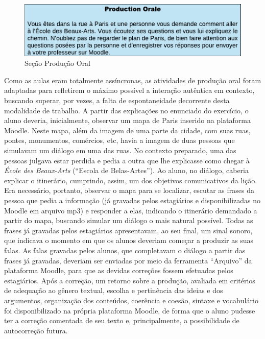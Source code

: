 \begin{figure}[htbp]
	\centering
	\begin{minipage}{0.8\textwidth}
		\includegraphics[width=\textwidth]{imagem4.pdf}
		\caption{Seção Produção Oral}
		\label{fig-4}
	\end{minipage}
\end{figure}

Como as aulas eram totalmente assíncronas, as atividades de produção
oral foram adaptadas para refletirem o máximo possível a interação
autêntica em contexto, buscando superar, por vezes, a falta de
espontaneidade decorrente desta modalidade de trabalho. A partir das
explicações no enunciado do exercício, o aluno deveria, inicialmente,
observar um mapa de Paris inserido na plataforma Moodle. Neste mapa,
além da imagem de uma parte da cidade, com suas ruas, pontes,
monumentos, comércios, etc, havia a imagem de duas pessoas que simulavam
um diálogo em uma das ruas. No contexto preparado, uma das pessoas
julgava estar perdida e pedia a outra que lhe explicasse como chegar à
\emph{École des Beaux-Arts} (\enquote{Escola de Belas-Artes}). Ao aluno, no
diálogo, caberia explicar o itinerário, cumprindo, assim, um dos
objetivos comunicativos da lição. Era necessário, portanto, observar o
mapa para se localizar, escutar as frases da pessoa que pedia a
informação (já gravadas pelos estagiários e disponibilizadas no Moodle
em arquivo mp3) e responder a elas, indicando o itinerário demandado a
partir do mapa, buscando simular um diálogo o mais natural possível.
Todas as frases já gravadas pelos estagiários apresentavam, ao seu
final, um sinal sonoro, que indicava o momento em que os alunos deveriam
começar a produzir as suas falas. As falas gravadas pelos alunos, que
completavam o diálogo a partir das frases já gravadas, deveriam ser
enviadas por meio da ferramenta \enquote{Arquivo} da plataforma Moodle, para
que as devidas correções fossem efetuadas pelos estagiários. Após a
correção, um retorno sobre a produção, avaliada em critérios de
adequação ao gênero textual, escolha e pertinência das ideias e dos
argumentos, organização dos conteúdos, coerência e coesão, sintaxe e
vocabulário foi disponibilizado na própria plataforma Moodle, de forma
que o aluno pudesse ter a correção comentada de seu texto e,
principalmente, a possibilidade de autocorreção futura.

